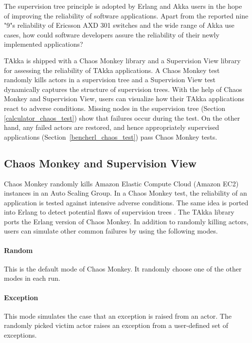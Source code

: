 The supervision tree principle is adopted by Erlang and Akka users in the 
hope of improving the reliability of software applications.  Apart from the 
reported nine "9"s reliability of Ericsson AXD 301 switches 
\citep{ArmstrongAXD} and the wide range of Akka use cases, how could software 
developers assure the reliability of their newly implemented applications?  

TAkka is shipped with a Chaos Monkey library and a Supervision View library for 
assessing the reliability of TAkka applications.  A Chaos Monkey test randomly 
kills actors in a supervision tree and a Supervision View test dynamically 
captures the structure of supervision trees.  With the help of Chaos Monkey and 
Supervision View, users can visualize how their TAkka applications react to 
adverse conditions. Missing nodes in the supervision tree (Section 
\ref{calculator_chaos_test}) show that failures occur during the test. On the 
other hand, any failed actors are restored, and hence appropriately supervised 
applications (Section~\ref{bencherl_chaos_test})  pass Chaos Monkey tests.



\subsection {Chaos Monkey and Supervision View}

Chaos Monkey \citep{ChaosMonkey} randomly kills Amazon Elastic Compute Cloud 
(Amazon EC2) instances in an Auto Scaling Group.  In a Chaos Monkey test, the 
reliability of an application is tested against intensive adverse 
conditions.  The same idea is ported into Erlang to detect potential flaws of 
supervision trees \citep{ErlangChaosMonkey}.  The TAkka library ports the 
Erlang version of Chaos Monkey.  In addition to randomly killing actors, 
users can simulate other common failures by using the following modes.

\paragraph{Random} This is the default mode of Chaos Monkey.  It randomly
choose one of the other modes in each run.

\paragraph{Exception} This mode simulates the case that an exception is raised
from an actor.  The randomly picked victim actor raises an exception from a
user-defined set of exceptions.



